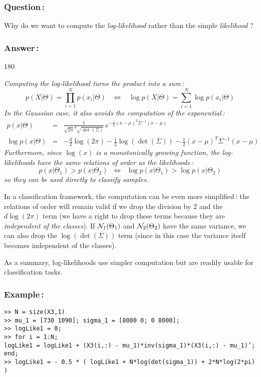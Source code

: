 \documentclass[twoside,a4paper,titlepage]{article}
\newcommand{\mat}[1]{{\tt >> #1} \\}
\newcommand{\com}[1]{{\tt #1}}
\newcommand{\expl}[1]{%
\begin{turn}{180}%
\parbox{\textwidth}{\em #1}%
\end{turn}%
}
\newcommand{\tab}{\hspace{1em}}
\begin{document}
\vspace{-1ex}
\subsubsection*{Question\,:}
Why do we want to compute the {\em log-likelihood} rather than the simple
{\em likelihood} ?

\subsubsection*{Answer\,:}
\expl{
Computing the log-likelihood turns the product into a sum\,:
\[
p(X|\Theta) = \prod_{i=1}^{N} p(x_i|\Theta)
\;\;\; \Leftrightarrow \;\;\;
\log p(X|\Theta) = \sum_{i=1}^{N} \log p(x_i|\Theta)
\]
In the Gaussian case, it also avoids the computation of the exponential\,:
\begin{eqnarray}
p(x|\Theta) & = & \frac{1}{\sqrt{2\pi}^d \sqrt{\det\left(\Sigma\right)}}
\, e^{-\frac{1}{2} (x-\mu)^T \Sigma^{-1} (x-\mu)} \nonumber \\
\log p(x|\Theta) & = &
- \frac{d}{2} \log \left( 2\pi \right)
- \frac{1}{2} \log \left( \det\left(\Sigma\right) \right)
- \frac{1}{2} (x-\mu)^T \Sigma^{-1} (x-\mu) \nonumber
\end{eqnarray}
Furthermore, since $\log(x)$ is a monotonically growing function, the
log-likelihoods have the same relations of order as the likelihoods\,:
\[
p(x|\Theta_1) > p(x|\Theta_2) \;\; \Leftrightarrow \;\;
\log p(x|\Theta_1) > \log p(x|\Theta_2)
\]
so they can be used directly to classify samples.

\tab In a classification framework, the computation can be even more
simplified\,: the relations of order will remain valid if we drop the
division by 2 and the $d \log (2\pi)$ term (we have a right to drop these
terms because they are {\em independent of the classes}). If ${\cal
N}_1(\Theta_1)$ and ${\cal N}_2(\Theta_2)$ have the same variance, we can
also drop the $\log (\det(\Sigma))$ term (since in this case the variance
itself becomes independent of the classes).

\tab As a summary, log-likelihoods use simpler computation but are readily
usable for classification tasks.}

\pagebreak
\subsubsection*{Example\,:}
\mat{N = size(X3,1)}
\mat{mu\_1 = [730 1090]; sigma\_1 = [8000 0; 0 8000];}
\mat{logLike1 = 0;}
\mat{for i = 1:N;}
\com{logLike1 = logLike1 + (X3(i,:) - mu\_1)*inv(sigma\_1)*(X3(i,:) - mu\_1)';} \\
\com{end;} \\
\mat{logLike1 =  - 0.5 * ( logLike1 + N*log(det(sigma\_1)) + 2*N*log(2*pi) )}
\end{document}

